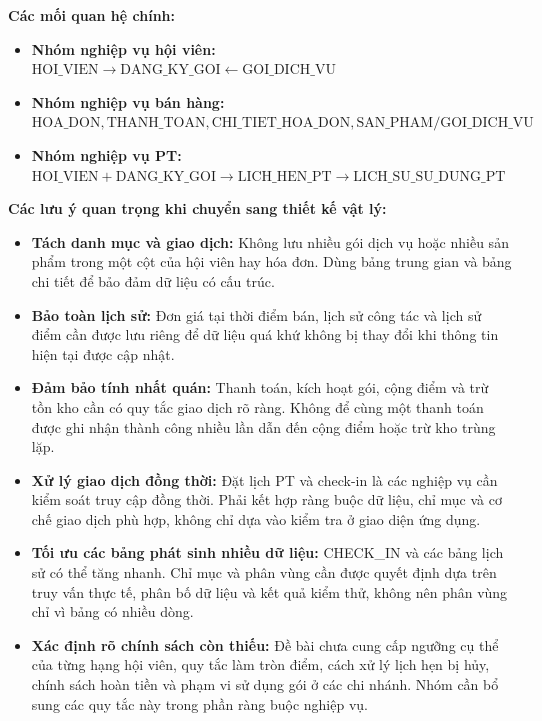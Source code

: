 \documentclass[11pt, a4paper]{article}
\begin{document}
\vspace{0.8em}
\textbf{Các mối quan hệ chính:}
\begin{itemize}
    \item \textbf{Nhóm nghiệp vụ hội viên:} $\text{HOI\_VIEN} \longrightarrow \text{DANG\_KY\_GOI} \longleftarrow \text{GOI\_DICH\_VU}$
    \item \textbf{Nhóm nghiệp vụ bán hàng:} $\text{HOA\_DON}, \text{THANH\_TOAN}, \text{CHI\_TIET\_HOA\_DON}, \text{SAN\_PHAM} / \text{GOI\_DICH\_VU}$
    \item \textbf{Nhóm nghiệp vụ PT:} $\text{HOI\_VIEN} + \text{DANG\_KY\_GOI} \longrightarrow \text{LICH\_HEN\_PT} \longrightarrow \text{LICH\_SU\_SU\_DUNG\_PT}$
\end{itemize}

\textbf{Các lưu ý quan trọng khi chuyển sang thiết kế vật lý:}
\begin{itemize}
    \item \textbf{Tách danh mục và giao dịch:} Không lưu nhiều gói dịch vụ hoặc nhiều sản phẩm trong một cột của hội viên hay hóa đơn. Dùng bảng trung gian và bảng chi tiết để bảo đảm dữ liệu có cấu trúc.
    \item \textbf{Bảo toàn lịch sử:} Đơn giá tại thời điểm bán, lịch sử công tác và lịch sử điểm cần được lưu riêng để dữ liệu quá khứ không bị thay đổi khi thông tin hiện tại được cập nhật.
    \item \textbf{Đảm bảo tính nhất quán:} Thanh toán, kích hoạt gói, cộng điểm và trừ tồn kho cần có quy tắc giao dịch rõ ràng. Không để cùng một thanh toán được ghi nhận thành công nhiều lần dẫn đến cộng điểm hoặc trừ kho trùng lặp.
    \item \textbf{Xử lý giao dịch đồng thời:} Đặt lịch PT và check-in là các nghiệp vụ cần kiểm soát truy cập đồng thời. Phải kết hợp ràng buộc dữ liệu, chỉ mục và cơ chế giao dịch phù hợp, không chỉ dựa vào kiểm tra ở giao diện ứng dụng.
    \item \textbf{Tối ưu các bảng phát sinh nhiều dữ liệu:} CHECK\_IN và các bảng lịch sử có thể tăng nhanh. Chỉ mục và phân vùng cần được quyết định dựa trên truy vấn thực tế, phân bố dữ liệu và kết quả kiểm thử, không nên phân vùng chỉ vì bảng có nhiều dòng.
    \item \textbf{Xác định rõ chính sách còn thiếu:} Đề bài chưa cung cấp ngưỡng cụ thể của từng hạng hội viên, quy tắc làm tròn điểm, cách xử lý lịch hẹn bị hủy, chính sách hoàn tiền và phạm vi sử dụng gói ở các chi nhánh. Nhóm cần bổ sung các quy tắc này trong phần ràng buộc nghiệp vụ.
\end{itemize}
\end{document}
